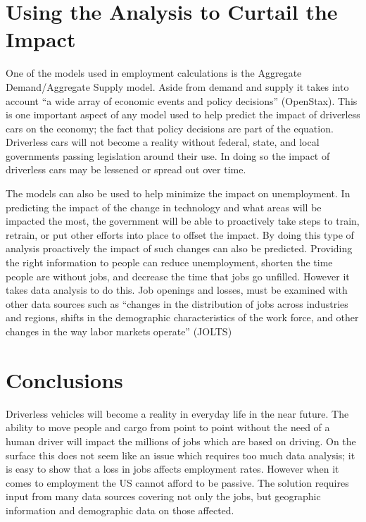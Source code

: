 \documentclass[sigconf]{acmart}
\begin{document}
\section{Using the Analysis to Curtail the Impact}

One of the models used in employment calculations is the Aggregate 
Demand/Aggregate Supply model.  Aside from demand and supply it takes into 
account ``a wide array of economic events and policy decisions'' (OpenStax).  
This is one important aspect of any model used to help predict the impact of 
driverless cars on the economy; the fact that policy decisions are part of 
the equation.  Driverless cars will not become a reality without federal, 
state, and local governments passing legislation around their use.  In doing 
so the impact of driverless cars may be lessened or spread out over time.  

The models can also be used to help minimize the impact on unemployment.  
In predicting the impact of the change in technology and what areas will 
be impacted the most, the government will be able to proactively take steps 
to train, retrain, or put other efforts into place to offset the impact.  
By doing this type of analysis proactively the impact of such changes can 
also be predicted.  Providing the right information to people can reduce 
unemployment, shorten the time people are without jobs, and decrease the 
time that jobs go unfilled.   However it takes data analysis to do this.  
Job openings and losses, must be examined with other data sources such 
as ``changes in the distribution of jobs across industries and regions, 
shifts in the demographic characteristics of the work force, and other 
changes in the way labor markets operate'' (JOLTS)

\section{Conclusions}

Driverless vehicles will become a reality in everyday life in the near future.  
The ability to move people and cargo from point to point without the need of a 
human driver will impact the millions of jobs which are based on driving.  On 
the surface this does not seem like an issue which requires too much data 
analysis; it is easy to show that a loss in jobs affects employment rates.  
However when it comes to employment the US cannot afford to be passive.  The 
solution requires input from many data sources covering not only the jobs, 
but geographic information and demographic data on those affected.    
\end{document}
